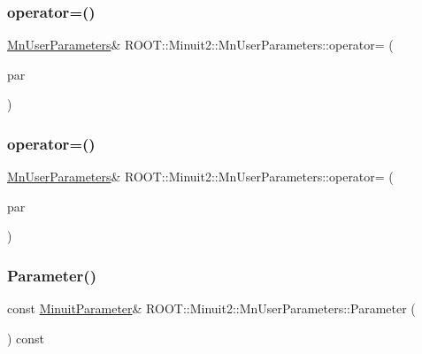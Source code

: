 \subsubsection{\texorpdfstring{operator=()}{operator=()}\hspace{0.1cm}{\footnotesize\ttfamily [1/2]}}
{\footnotesize\ttfamily \mbox{\hyperlink{classROOT_1_1Minuit2_1_1MnUserParameters}{Mn\+User\+Parameters}}\& R\+O\+O\+T\+::\+Minuit2\+::\+Mn\+User\+Parameters\+::operator= (\begin{DoxyParamCaption}\item[{const \mbox{\hyperlink{classROOT_1_1Minuit2_1_1MnUserParameters}{Mn\+User\+Parameters}} \&}]{par }\end{DoxyParamCaption})\hspace{0.3cm}{\ttfamily [inline]}}

\mbox{\label{classROOT_1_1Minuit2_1_1MnUserParameters_a21d8a1f70098c2c9c82015cf0867c8ea}} 
\subsubsection{\texorpdfstring{operator=()}{operator=()}\hspace{0.1cm}{\footnotesize\ttfamily [2/2]}}
{\footnotesize\ttfamily \mbox{\hyperlink{classROOT_1_1Minuit2_1_1MnUserParameters}{Mn\+User\+Parameters}}\& R\+O\+O\+T\+::\+Minuit2\+::\+Mn\+User\+Parameters\+::operator= (\begin{DoxyParamCaption}\item[{const \mbox{\hyperlink{classROOT_1_1Minuit2_1_1MnUserParameters}{Mn\+User\+Parameters}} \&}]{par }\end{DoxyParamCaption})\hspace{0.3cm}{\ttfamily [inline]}}

\mbox{\label{classROOT_1_1Minuit2_1_1MnUserParameters_a13bfc3bb154a2e8974fb20e9524b96da}} 
\subsubsection{\texorpdfstring{Parameter()}{Parameter()}\hspace{0.1cm}{\footnotesize\ttfamily [1/2]}}
{\footnotesize\ttfamily const \mbox{\hyperlink{classROOT_1_1Minuit2_1_1MinuitParameter}{Minuit\+Parameter}}\& R\+O\+O\+T\+::\+Minuit2\+::\+Mn\+User\+Parameters\+::\+Parameter (\begin{DoxyParamCaption}\item[{unsigned int}]{ }\end{DoxyParamCaption}) const}



